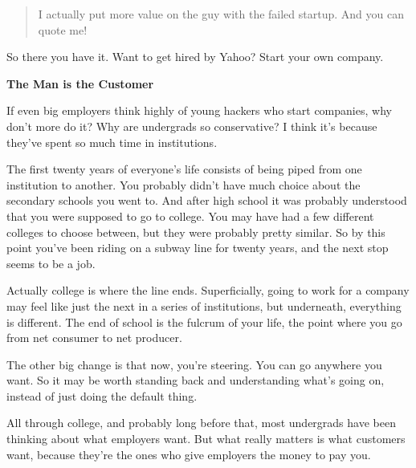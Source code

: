                   \begin{quote}

                    I actually put more value on the guy with the failed
                    startup. And you can quote me!
                  
\end{quote}

                  So there you have it. Want to get hired by Yahoo? Start your
                  own company.

\textbf{The Man is the Customer}

If even big employers think highly of young
                  hackers who start companies, why don't more do it? Why are
                  undergrads so conservative? I think it's because they've spent
                  so much time in institutions.

The first twenty
                  years of everyone's life consists of being piped from one
                  institution to another. You probably didn't have much choice
                  about the secondary schools you went to. And after high school
                  it was probably understood that you were supposed to go to
                  college. You may have had a few different colleges to choose
                  between, but they were probably pretty similar. So by this
                  point you've been riding on a subway line for twenty years,
                  and the next stop seems to be a job.

Actually
                  college is where the line ends. Superficially, going to work
                  for a company may feel like just the next in a series of
                  institutions, but underneath, everything is different. The end
                  of school is the fulcrum of your life, the point where you go
                  from net consumer to net producer.

The other big
                  change is that now, you're steering. You can go anywhere you
                  want. So it may be worth standing back and understanding
                  what's going on, instead of just doing the default thing.

All
                  through college, and probably long before that, most
                  undergrads have been thinking about what employers want. But
                  what really matters is what customers want, because they're
                  the ones who give employers the money to pay you.

